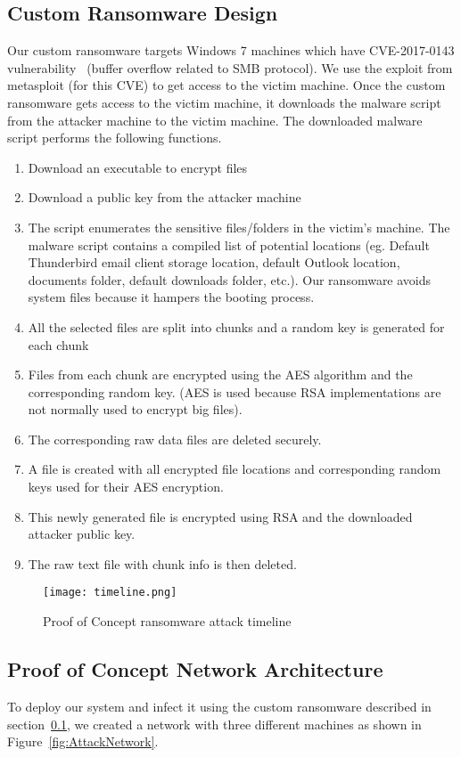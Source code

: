 \subsection{Custom Ransomware Design} 
\label{sec:CustomRansomwareDesign}

Our custom ransomware targets Windows 7 machines which have CVE-2017-0143 vulnerability~\cite{CVE-2017-0143} (buffer overflow related to SMB protocol). We use the exploit from metasploit (for this CVE) to get access to the victim machine. Once the custom ransomware gets access to the victim machine, it downloads the malware script from the attacker machine to the victim machine. The downloaded malware script performs the following functions.
\begin{enumerate}
	\item Download an executable to encrypt files
	\item Download a public key from the attacker machine
	\item The script enumerates the sensitive files/folders in the victim's machine. The malware script contains a compiled list of potential locations (eg. Default Thunderbird email client storage location, default Outlook location, documents folder, default downloads folder, etc.). Our ransomware avoids system files because it hampers the booting process.
	\item All the selected files are split into chunks and a random key is generated for each chunk
	\item Files from each chunk are encrypted using the AES algorithm and the corresponding random key. (AES is used because RSA implementations are not normally used to encrypt big files).
	\item The corresponding raw data files are deleted securely.
	\item A file is created with all encrypted file locations and corresponding random keys used for their AES encryption.
	\item This newly generated file is encrypted using RSA and the downloaded attacker public key.
	\item The raw text file with chunk info is then deleted.
	
\end{enumerate} 
\begin{figure*}[h]	
	\texttt{[image: timeline.png]}
	\caption{Proof of Concept ransomware attack timeline}	
	\label{fig:AttackTimeline}
\end{figure*}
\subsection{Proof of Concept Network Architecture}
\label{sec:POCNetwork}
To deploy our system and infect it using the custom ransomware described in section~\ref{sec:CustomRansomwareDesign}, we created a network with three different machines as shown in Figure~\ref{fig:AttackNetwork}. 

